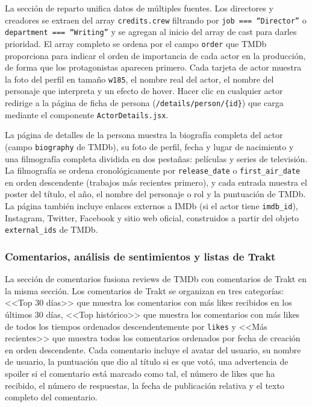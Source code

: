La sección de reparto unifica datos de múltiples fuentes. Los directores y creadores se extraen del array \texttt{credits.crew} filtrando por \texttt{job === ``Director''} o \texttt{department === ``Writing''} y se agregan al inicio del array de cast para darles prioridad. El array completo se ordena por el campo \texttt{order} que TMDb proporciona para indicar el orden de importancia de cada actor en la producción, de forma que los protagonistas aparecen primero. Cada tarjeta de actor muestra la foto del perfil en tamaño \texttt{w185}, el nombre real del actor, el nombre del personaje que interpreta y un efecto de hover. Hacer clic en cualquier actor redirige a la página de ficha de persona (\texttt{/details/person/\{id\}}) que carga mediante el componente \texttt{ActorDetails.jsx}.

La página de detalles de la persona muestra la biografía completa del actor (campo \texttt{biography} de TMDb), su foto de perfil, fecha y lugar de nacimiento y una filmografía completa dividida en dos pestañas: películas y series de televisión. La filmografía se ordena cronológicamente por \texttt{release\_date} o \texttt{first\_air\_date} en orden descendente (trabajos más recientes primero), y cada entrada muestra el poster del título, el año, el nombre del personaje o rol y la puntuación de TMDb. La página también incluye enlaces externos a IMDb (si el actor tiene \texttt{imdb\_id}), Instagram, Twitter, Facebook y sitio web oficial, construidos a partir del objeto \texttt{external\_ids} de TMDb.

\subsubsection{Comentarios, análisis de sentimientos y listas de Trakt}

La sección de comentarios fusiona reviews de TMDb con comentarios de Trakt en la misma sección. Los comentarios de Trakt se organizan en tres categorías: <<Top 30 días>> que muestra los comentarios con más likes recibidos en los últimos 30 días, <<Top histórico>> que muestra los comentarios con más likes de todos los tiempos ordenados descendentemente por \texttt{likes} y <<Más recientes>> que muestra todos los comentarios ordenados por fecha de creación en orden descendente. Cada comentario incluye el avatar del usuario, su nombre de usuario, la puntuación que dio al título si es que votó, una advertencia de spoiler si el comentario está marcado como tal, el número de likes que ha recibido, el número de respuestas, la fecha de publicación relativa y el texto completo del comentario.

